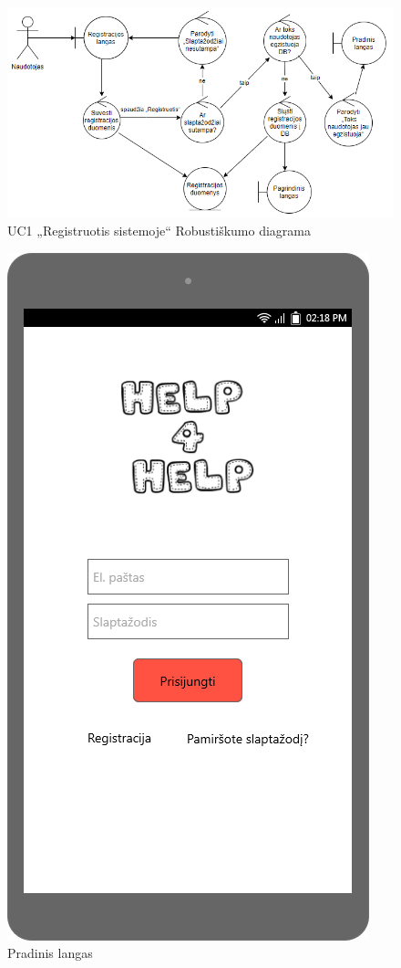 \documentclass{VUMIFPSbakalaurinis}
\begin{document}
\begin{figure}[H]
	\centering
	\includegraphics[scale=0.6]{img/Robustness/UC1}
	\caption{UC1 „Registruotis sistemoje“ Robustiškumo diagrama}
	\label{img:uc1rob}
\end{figure}

\begin{figure}[H]
	\centering
	\includegraphics[scale=0.4]{img/ScreenShots/01-Pradinis-langas}
	\caption{Pradinis langas}
	\label{img:login}
\end{figure}
\end{document}
